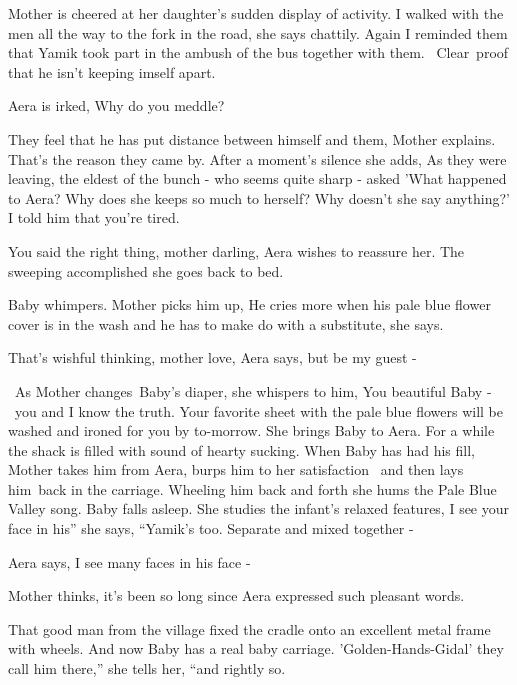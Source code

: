 \documentclass[letterpaper]{article}
\begin{document}
Mother is cheered at her daughter's sudden display of activity. {\textquotedbl}I walked with the men all the way to the
fork in the road,{\textquotedbl} she says chattily. {\textquotedbl}Again I reminded them that Yamik took part in the
ambush of the bus together with them. \ Clear~proof that he isn't keeping imself apart.{\textquotedbl}

Aera is irked, {\textquotedbl}Why do you meddle?{\textquotedbl} 

{\textquotedbl}They feel that he has put distance between himself and them,{\textquotedbl} Mother explains.
{\textquotedbl}That's the reason they came by.{\textquotedbl} After a moment's silence she adds, {\textquotedbl}As they
were leaving, the eldest of the bunch - who seems quite sharp - asked 'What happened to Aera? Why does she keeps so
much to herself? Why doesn't she say anything?' I told him that you're tired.{\textquotedbl} 

{\textquotedbl}You said the right thing, mother darling,{\textquotedbl} Aera wishes to reassure her. The sweeping
accomplished she goes back to bed.

Baby whimpers. Mother picks him up, {\textquotedbl}He cries more when his pale blue flower cover is in the wash and he
has to make do with a substitute,{\textquotedbl} she says. 

{\textquotedbl}That's wishful thinking, mother love,{\textquotedbl} Aera says, {\textquotedbl}but be my guest
-{\textquotedbl}

~As Mother changes~Baby's diaper, she whispers to him, {\textquotedbl}You beautiful Baby - ~you and I know the truth.
Your favorite sheet with the pale blue flowers will be washed and ironed for you by to-morrow.{\textquotedbl} She
brings Baby to Aera. For a while the shack is filled with sound of hearty sucking. When Baby has had his fill, Mother
takes him from Aera, burps him to her satisfaction \ and then lays him~back in the carriage. Wheeling him back and
forth she hums the Pale Blue Valley song. Baby falls asleep. She studies the infant's relaxed features,
{\textquotedbl}I see your face in his'' she says, ``Yamik's too. Separate and mixed together -{\textquotedbl} 

Aera says, {\textquotedbl}I see many faces in his face -{\textquotedbl}~ 

Mother thinks, it's been so long since Aera expressed such\textcolor{red}{ }pleasant words. 

{\textquotedbl}That good man from the village fixed the cradle onto\textcolor{red}{ }an excellent metal frame with
wheels. And now Baby has a real baby carriage. 'Golden-Hands-Gidal' they call him there,'' she tells her, ``and rightly
so.{\textquotedbl} 
\end{document}
